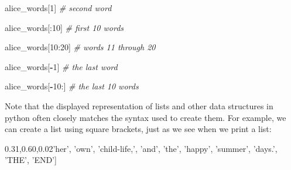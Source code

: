 \documentclass[]{book}
\newenvironment{Shaded}{\begin{snugshade}}{\end{snugshade}}
\newcommand{\DecValTok}[1]{\textcolor[rgb]{0.00,0.00,0.81}{#1}}
\newcommand{\StringTok}[1]{\textcolor[rgb]{0.31,0.60,0.02}{#1}}
\newcommand{\CommentTok}[1]{\textcolor[rgb]{0.56,0.35,0.01}{\textit{#1}}}
\newcommand{\OperatorTok}[1]{\textcolor[rgb]{0.81,0.36,0.00}{\textbf{#1}}}
\newcommand{\NormalTok}[1]{#1}
\begin{document}
\begin{Shaded}
\begin{Highlighting}[]
\NormalTok{alice_words[}\DecValTok{1}\NormalTok{] }\CommentTok{# second word}
\end{Highlighting}
\end{Shaded}

\begin{Shaded}
\begin{Highlighting}[]
\NormalTok{alice_words[:}\DecValTok{10}\NormalTok{] }\CommentTok{# first 10 words}
\end{Highlighting}
\end{Shaded}

\begin{Shaded}
\begin{Highlighting}[]
\NormalTok{alice_words[}\DecValTok{10}\NormalTok{:}\DecValTok{20}\NormalTok{] }\CommentTok{# words 11 through 20}
\end{Highlighting}
\end{Shaded}

\begin{Shaded}
\begin{Highlighting}[]
\NormalTok{alice_words[}\OperatorTok{-}\DecValTok{1}\NormalTok{] }\CommentTok{# the last word}
\end{Highlighting}
\end{Shaded}

\begin{Shaded}
\begin{Highlighting}[]
\NormalTok{alice_words[}\OperatorTok{-}\DecValTok{10}\NormalTok{:] }\CommentTok{# the last 10 words}
\end{Highlighting}
\end{Shaded}

Note that the displayed representation of lists and other data
structures in python often closely matches the syntax used to create
them. For example, we can create a list using square brackets, just as
we see when we print a list:

\begin{Shaded}
\begin{Highlighting}[]
\NormalTok{[}\StringTok{'her'}\NormalTok{,}
 \StringTok{'own'}\NormalTok{,}
 \StringTok{'child-life,'}\NormalTok{,}
 \StringTok{'and'}\NormalTok{,}
 \StringTok{'the'}\NormalTok{,}
 \StringTok{'happy'}\NormalTok{,}
 \StringTok{'summer'}\NormalTok{,}
 \StringTok{'days.'}\NormalTok{,}
 \StringTok{'THE'}\NormalTok{,}
 \StringTok{'END'}\NormalTok{]}
\end{Highlighting}
\end{Shaded}
\end{document}
